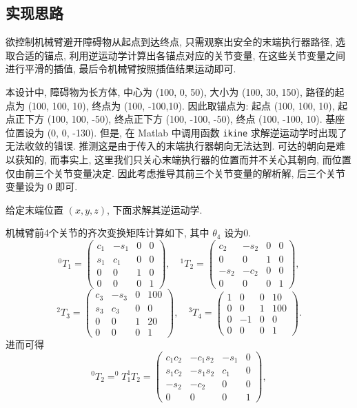 \documentclass{article}
\begin{document}
\subsection{实现思路}
欲控制机械臂避开障碍物从起点到达终点, 只需观察出安全的末端执行器路径, 选取合适的锚点, 利用逆运动学计算出各锚点对应的关节变量, 在这些关节变量之间进行平滑的插值, 最后令机械臂按照插值结果运动即可.\par
本设计中, 障碍物为长方体, 中心为 (100, 0, 50), 大小为 (100, 30, 150), 路径的起点为 (100, 100, 10), 终点为 (100, -100,10). 因此取锚点为: 起点 (100, 100, 10), 起点正下方 (100, 100, -50), 终点正下方 (100, -100, -50), 终点 (100, -100, 10). 基座位置设为 (0, 0, -130). 但是, 在 Matlab 中调用函数 \verb|ikine| 求解逆运动学时出现了无法收敛的错误. 推测这是由于传入的末端执行器朝向无法达到. 可达的朝向是难以获知的, 而事实上, 这里我们只关心末端执行器的位置而并不关心其朝向, 而位置仅由前三个关节变量决定. 因此考虑推导其前三个关节变量的解析解, 后三个关节变量设为 0 即可.\par
给定末端位置 $(x,y,z)$, 下面求解其逆运动学.\par
机械臂前4个关节的齐次变换矩阵计算如下, 其中 $\theta_4$ 设为0.
\[
^0T_1 = 
\begin{pmatrix}
c_1 & -s_1 & 0 & 0\\
s_1 & c_1 & 0 & 0\\
0 & 0 & 1 & 0\\
0 & 0 & 0 & 1
\end{pmatrix}, \quad
^1T_2 = 
\begin{pmatrix}
c_2 & -s_2 & 0 & 0\\
0 & 0 & 1 & 0\\
-s_2 & -c_2 & 0 & 0\\
0 & 0 & 0 & 1
\end{pmatrix},
\]
\[
^2T_3 = 
\begin{pmatrix}
c_3 & -s_3 & 0 & 100\\
s_3 & c_3 & 0 & 0\\
0 & 0 & 1 & 20\\
0 & 0 & 0 & 1
\end{pmatrix}, \quad
^3T_4 = 
\begin{pmatrix}
1 & 0 & 0 & 10\\
0 & 0 & 1 & 100\\
0 & -1 & 0 & 0\\
0 & 0 & 0 & 1
\end{pmatrix}.
\]
进而可得
\[
^0T_2 = ^0T_1 ^1T_2 = 
\begin{pmatrix}
c_1 c_2 & -c_1 s_2 & -s_1 & 0\\
s_1 c_2 & -s_1 s_2 & c_1 & 0\\
-s_2 & -c_2 & 0 & 0\\
0 & 0 & 0 & 1
\end{pmatrix},
\]
\end{document}
